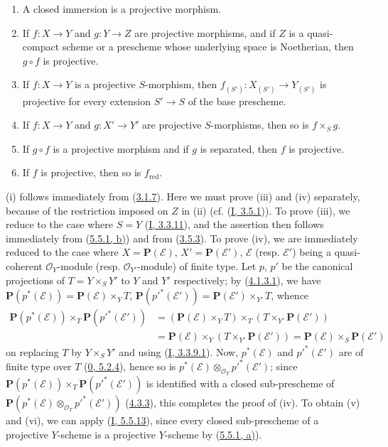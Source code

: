 \begin{proposition}[5.5.5]
\label{II.5.5.5}
\begin{enumerate}
  \item[\rm{(i)}] A closed immersion is a projective morphism.
  \item[\rm{(ii)}] If $f:X\to Y$ and $g:Y\to Z$ are projective
  morphisms, and if $Z$ is a quasi-compact scheme or a prescheme whose
  underlying space is Noetherian, then $g\circ f$ is projective.
  \item[\rm{(iii)}] If $f:X\to Y$ is a projective $S$-morphism, then
  $f_{(S')}:X_{(S')}\to Y_{(S')}$ is projective for every extension
  $S'\to S$ of the base prescheme.
  \item[\rm{(iv)}] If $f:X\to Y$ and $g:X'\to Y'$ are projective
  $S$-morphisms, then so is $f\times_Sg$.
  \item[\rm{(v)}] If $g\circ f$ is a projective morphism and if $g$ is
  separated, then $f$ is projective.
  \item[\rm{(vi)}] If $f$ is projective, then so is
  $f_{\mathrm{red}}$.
\end{enumerate}
\end{proposition}

(i) follows immediately from (\hyperref[II.3.1.7]{3.1.7}). Here we must
prove (iii) and (iv) separately, because of the restriction imposed on
$Z$ in (ii) (cf. (\hyperref[I.3.5.1]{I, 3.5.1})). To prove (iii), we
reduce to the case where $S=Y$ (\hyperref[I.3.3.11]{I, 3.3.11}), and the
assertion then follows immediately from (\hyperref[II.5.5.1]{5.5.1, b)})
and from (\hyperref[II.3.5.3]{3.5.3}). To prove (iv), we are immediately
reduced to the case where $X=\mathbf{P}(\mathcal{E})$,
$X'=\mathbf{P}(\mathcal{E}')$, $\mathcal{E}$ (resp. $\mathcal{E}'$) being a
quasi-coherent $\mathcal{O}_Y$-module (resp. $\mathcal{O}_{Y'}$-module) of
finite type. Let $p$, $p'$ be the canonical projections of $T=Y\times_SY'$
to $Y$ and $Y'$ respectively; by (\hyperref[II.4.1.3.1]{4.1.3.1}), we have
$\mathbf{P}(p^*(\mathcal{E}))=\mathbf{P}(\mathcal{E})\times_YT$,
$\mathbf{P}(p'^*(\mathcal{E}'))=\mathbf{P}(\mathcal{E}')\times_{Y'}T$, whence
\begin{align*}
\mathbf{P}(p^*(\mathcal{E}))\times_T\mathbf{P}(p'^*(\mathcal{E}'))
&=(\mathbf{P}(\mathcal{E})\times_YT)\times_T
(T\times_{Y'}\mathbf{P}(\mathcal{E}'))\\
&=\mathbf{P}(\mathcal{E})\times_Y
(T\times_{Y'}\mathbf{P}(\mathcal{E}'))
=\mathbf{P}(\mathcal{E})\times_S\mathbf{P}(\mathcal{E}')
\end{align*}
on replacing $T$ by $Y\times_SY'$ and using
(\hyperref[I.3.3.9.1]{I, 3.3.9.1}). Now, $p^*(\mathcal{E})$ and
$p'^*(\mathcal{E}')$ are of finite type over $T$
(\hyperref[0.5.2.4]{0, 5.2.4}), hence so is
$p^*(\mathcal{E})\otimes_{\mathcal{O}_T}p'^*(\mathcal{E}')$; since
$\mathbf{P}(p^*(\mathcal{E}))\times_T\mathbf{P}(p'^*(\mathcal{E}'))$
is identified with a closed sub-prescheme of
$\mathbf{P}(p^*(\mathcal{E})\otimes_{\mathcal{O}_T}p'^*(\mathcal{E}'))$
(\hyperref[II.4.3.3]{4.3.3}), this completes the proof of (iv). To obtain
(v) and (vi), we can apply (\hyperref[I.5.5.13]{I, 5.5.13}), since every
closed sub-prescheme of a projective $Y$-scheme is a projective $Y$-scheme by
(\hyperref[II.5.5.1]{5.5.1, a)}).

